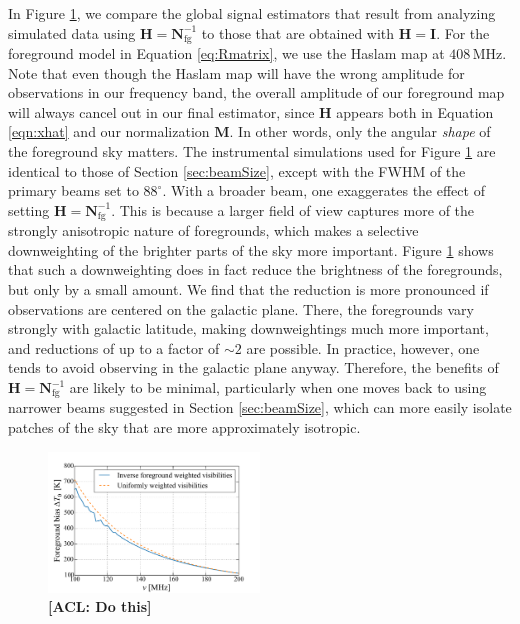 \documentclass[twolcolumn,apj,iop,numberedappendix]{emulateapj}
\newcommand{\Hmat}{\mathbf{H}}
\newcommand{\Nfg}{\mathbf{N}_{\textrm{fg}}}
\newcommand{\M}{\mathbf{M}}
\newcommand{\acl}[1]{{\color{red} \textbf{[ACL:  #1]}}}
\begin{document}
In Figure \ref{fig:Ncomparison}, we compare the global signal estimators that result from analyzing simulated data using $\Hmat = \Nfg^{-1}$ to those that are obtained with $\Hmat = \mathbf{I}$. For the foreground model in Equation \eqref{eq:Rmatrix}, we use the Haslam map at $408\,\textrm{MHz}$. Note that even though the Haslam map will have the wrong amplitude for observations in our frequency band, the overall amplitude of our foreground map will always cancel out in our final estimator, since $\Hmat$ appears both in Equation \eqref{eqn:xhat} and our normalization $\M$. In other words, only the angular \emph{shape} of the foreground sky matters. The instrumental simulations used for Figure \ref{fig:Ncomparison} are identical to those of Section \ref{sec:beamSize}, except with the FWHM of the primary beams set to $88^\circ$. With a broader beam, one exaggerates the effect of setting $\Hmat = \Nfg^{-1}$. This is because a larger field of view captures more of the strongly anisotropic nature of foregrounds, which makes a selective downweighting of the brighter parts of the sky more important. Figure \ref{fig:Ncomparison} shows that such a downweighting does in fact reduce the brightness of the foregrounds, but only by a small amount. We find that the reduction is more pronounced if observations are centered on the galactic plane. There, the foregrounds vary strongly with galactic latitude, making downweightings much more important, and reductions of up to a factor of $\sim 2$ are possible. In practice, however, one tends to avoid observing in the galactic plane anyway. Therefore, the benefits of $\Hmat = \Nfg^{-1}$ are likely to be minimal, particularly when one moves back to using narrower beams suggested in Section \ref{sec:beamSize}, which can more easily isolate patches of the sky that are more approximately isotropic.

\begin{figure}[h]
	\centering
	\includegraphics[width=0.50\textwidth]{figures/Ncomparison.pdf}
	\caption{\acl{Do this}}
	\label{fig:Ncomparison}
\end{figure}
\end{document}
